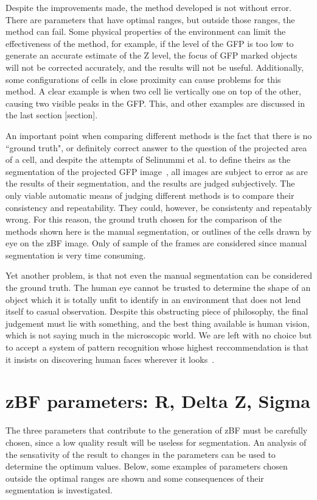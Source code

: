 Despite the improvements made, the method developed is not without error. There are parameters that have optimal ranges, but outside those ranges, the method can fail. Some physical properties of the environment can limit the effectiveness of the method, for example, if the level of the GFP is too low to generate an accurate estimate of the Z level, the focus of GFP marked objects will not be corrected accurately, and the results will not be useful. Additionally, some configurations of cells in close proximity can cause problems for this method. A clear example is when two cell lie vertically one on top of the other, causing two visible peaks in the GFP. This, and other examples are discussed in the last section [section].

An important point when comparing different methods is the fact that there is no ``ground truth", or definitely correct answer to the question of the projected area of a cell, and despite the attempts of Selinummi et al. to define theirs as the segmentation of the projected GFP image~\cite{Selinummi:09}, all images are subject to error as are the results of their segmentation, and the results are judged subjectively. The only viable automatic means of judging different methods is to compare their consistency and repeatability. They could, however, be consistenty and repeatably wrong. For this reason, the ground truth chosen for the comparison of the methods shown here is the manual segmentation, or outlines of the cells drawn by eye on the zBF image. Only of sample of the frames are considered since manual segmentation is very time consuming.

Yet another problem, is that not even the manual segmentation can be considered the ground truth. The human eye cannot be trusted to determine the shape of an object which it is totally unfit to identify in an environment that does not lend itself to casual observation. Despite this obstructing piece of philosophy, the final judgement must lie with something, and the best thing available is human vision, which is not saying much in the microscopic world. We are left with no choice but to accept a system of pattern recognition whose highest reccommendation is that it insists on discovering human faces wherever it looks~\cite{Fyfe:08}.

\section{zBF parameters: R, Delta Z, Sigma}

The three parameters that contribute to the generation of zBF must be carefully chosen, since a low quality result will be useless for segmentation. An analysis of the sensativity of the result to changes in the parameters can be used to determine the optimum values. Below, some examples of parameters chosen outside the optimal ranges are shown and some consequences of their segmentation is investigated.

